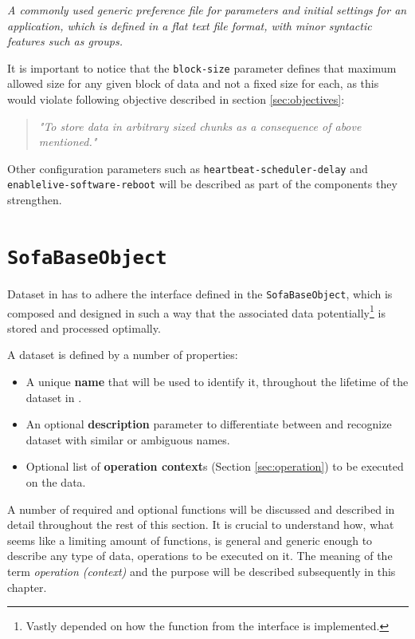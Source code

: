 \vspace*{4mm}
\begin{definition}[.cfg] \label{def:cfg}
\textit{A commonly used generic preference file for parameters and initial settings for an application, which is defined in a flat text file format, with minor syntactic features such as groups.}
\end{definition}
\vspace*{6mm}

It is important to notice that the \texttt{block-size} parameter defines that maximum allowed size for any given block of data and not a fixed size for each, as this would violate following objective described in section \ref{sec:objectives}:

\begin{quotation}
	\textit{"To store data in arbitrary sized chunks as a consequence of above mentioned."}
\end{quotation}

Other configuration parameters such as \texttt{heartbeat-scheduler-delay} and \texttt{enable\-live-software-reboot} will be described as part of the components they strengthen.

\section{\texttt{SofaBaseObject}} \label{sec:sofabaseobject}
Dataset in \CodeName has to adhere the interface defined in the \texttt{SofaBaseObject}, which is composed and designed in such a way that the associated data potentially\footnote{Vastly depended on how the function from the interface is implemented.} is stored and processed optimally.

\vspace*{5mm}
A dataset is defined by a number of properties:
\begin{itemize}
	\item A unique \textbf{name} that will be used to identify it, throughout the lifetime of the dataset in \CodeName.
	\item An optional \textbf{description} parameter to differentiate between and recognize dataset with similar or ambiguous names.
	\item Optional list of \textbf{operation context}s (Section \ref{sec:operation}) to be executed on the data.
\end{itemize}
\vspace*{5mm}

A number of required and optional functions will be discussed and described in detail throughout the rest of this section. It is crucial to understand how, what seems like a limiting amount of functions, is general and generic enough to describe any type of data, operations to be executed on it. The meaning of the term \textit{operation (context)} and the purpose will be described subsequently in this chapter. 
\newline

